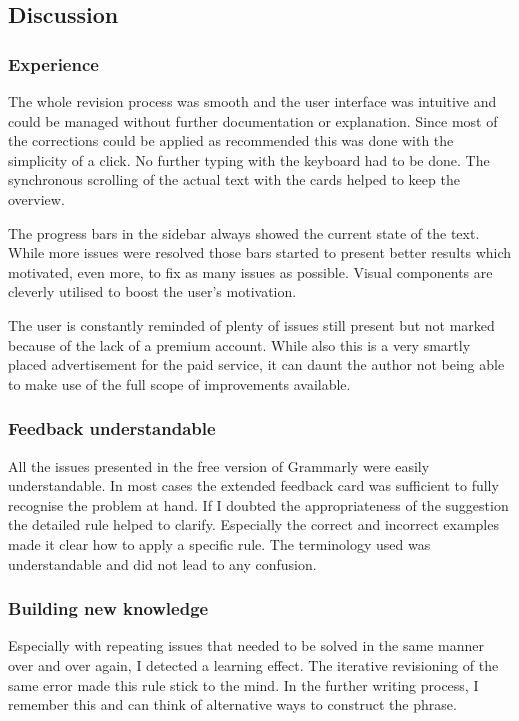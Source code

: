 \documentclass[runningheads]{llncs}
\let\OldTextregistered\textregistered
\renewcommand{\textregistered}{\OldTextregistered\xspace}
\begin{document}
\subsection{Discussion}
\subsubsection{Experience}
The whole revision process was smooth and the user interface was intuitive and could be managed without further documentation or explanation. Since most of the corrections could be applied as recommended this was done with the simplicity of a click. No further typing with the keyboard had to be done. The synchronous scrolling of the actual text with the cards helped to keep the overview.

The progress bars in the sidebar always showed the current state of the text. While more issues were resolved those bars started to present better results which motivated, even more, to fix as many issues as possible. Visual components are cleverly utilised to boost the user's motivation.

The user is constantly reminded of plenty of issues still present but not marked because of the lack of a premium account. While also this is a very smartly placed advertisement for the paid service, it can daunt the author not being able to make use of the full scope of improvements available.

\subsubsection{Feedback understandable}
All the issues presented in the free version of Grammarly\textregistered were easily understandable. In most cases the extended feedback card was sufficient to fully recognise the problem at hand. If I doubted the appropriateness of the suggestion the detailed rule helped to clarify. Especially the correct and incorrect examples made it clear how to apply a specific rule. The terminology used was understandable and did not lead to any confusion.

\subsubsection{Building new knowledge}
Especially with repeating issues that needed to be solved in the same manner over and over again, I detected a learning effect. The iterative revisioning of the same error made this rule stick to the mind. In the further writing process, I remember this and can think of alternative ways to construct the phrase.
\end{document}
